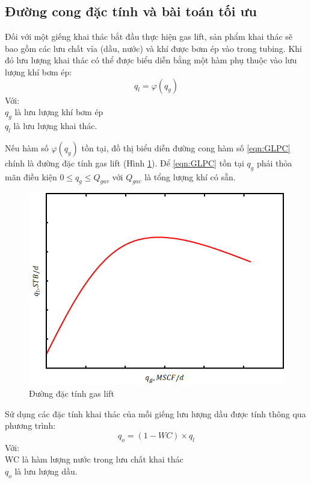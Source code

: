 \documentclass[12pt,a4paper]{report}
\begin{document}
\subsection{Đường cong đặc tính và bài toán tối ưu}\label{glpc-opt-problem}
Đối với một giếng khai thác bắt đầu thực hiện gas lift, sản phẩm khai thác sẽ bao gồm các lưu chất vỉa (dầu, nước) và khí được bơm ép vào trong tubing. Khi đó lưu lượng khai thác có thể được biểu diễn bằng một hàm phụ thuộc vào lưu lượng khí bơm ép:
	\begin{equation}\label{eqn:GLPC}
		q_l = \varphi(q_g)
	\end{equation}
Với:\\
\hspace*{1cm}$q_g$ là lưu lượng khí bơm ép\\
\hspace*{1cm}$q_l$ là lưu lượng khai thác.

Nếu hàm số $\varphi(q_g)$ tồn tại, đồ thị biểu diễn đường cong hàm số \ref{eqn:GLPC} chính là đường đặc tính gas lift (Hình \ref{fig:glpc}). Để \ref{eqn:GLPC} tồn tại $q_g$ phải thỏa mãn điều kiện $0 \leq q_g \leq Q_{gav}$ với $Q_{gav}$ là tổng lượng khí có sẵn.

	\begin{figure}[h]
		\centering
		\includegraphics[scale=.6]{fig/glpc.png}
		\caption{Đường đặc tính gas lift}
		\label{fig:glpc}
	\end{figure}

Sử dụng các đặc tính khai thác của mỗi giếng lưu lượng dầu được tính thông qua phương trình:
	\begin{equation}\label{eqn:qo-vs-ql}
		q_o = (1 - WC) \times q_l
	\end{equation}
Với:\\
\hspace*{1cm}WC là hàm lượng nước trong lưu chất khai thác\\
\hspace*{1cm}$q_o$ là lưu lượng dầu.
\end{document}
